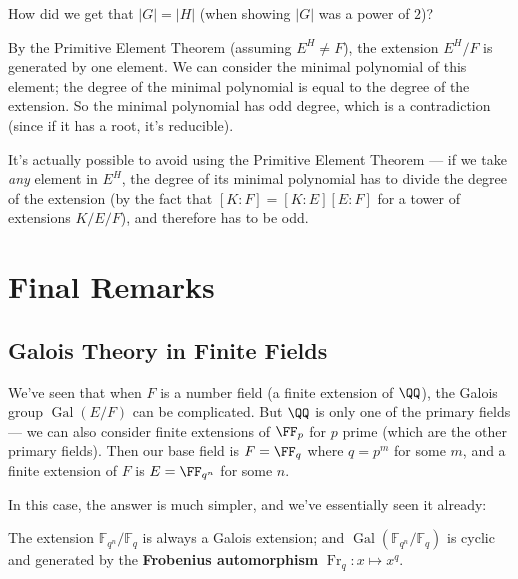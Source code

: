 \begin{question}
    How did we get that $\lvert G \rvert = \lvert H\rvert$ (when showing $\lvert G \rvert$ was a power of $2$)?
\end{question}

\begin{ans}
By the Primitive Element Theorem (assuming $E^H \neq F$), the extension $E^H/F$ is generated by one element. We can consider the minimal polynomial of this element; the degree of the minimal polynomial is equal to the degree of the extension. So the minimal polynomial has odd degree, which is a contradiction (since if it has a root, it's reducible). 

It's actually possible to avoid using the Primitive Element Theorem --- if we take \emph{any} element in $E^H$, the degree of its minimal polynomial has to divide the degree of the extension (by the fact that $[K : F] = [K : E][E : F]$ for a tower of extensions $K/E/F$), and therefore has to be odd. 
\end{ans}



\section{Final Remarks}

\subsection{Galois Theory in Finite Fields}

We've seen that when $F$ is a number field (a finite extension of $\QQ$), the Galois group $\operatorname{Gal}(E/F)$ can be complicated. But $\QQ$ is only one of the primary fields --- we can also consider finite extensions of $\FF_p$ for $p$ prime (which are the other primary fields). Then our base field is $F = \FF_q$ where $q = p^m$ for some $m$, and a finite extension of $F$ is $E = \FF_{q^n}$ for some $n$.

In this case, the answer is much simpler, and we've essentially seen it already:

\begin{theorem}
    The extension $\mathbb{F}_{q^n}/\mathbb{F}_q$ is always a Galois extension; and $\operatorname{Gal}(\mathbb{F}_{q^n}/\mathbb{F}_q)$ is cyclic and generated by the \textbf{Frobenius automorphism} $\operatorname{Fr}_q : x \mapsto x^q$. 
\end{theorem}

